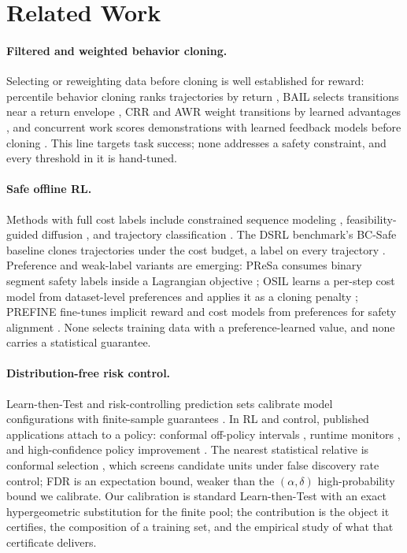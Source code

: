 \documentclass{article} %
\begin{document}
\section{Related Work}
\label{sec:related}

\paragraph{Filtered and weighted behavior cloning.}
Selecting or reweighting data before cloning is well established for reward: percentile behavior cloning ranks trajectories by return \citep{chen2021dt, emmons2022rvs}, BAIL selects transitions near a return envelope \citep{chen2020bail}, CRR and AWR weight transitions by learned advantages \citep{wang2020crr, peng2019awr}, and concurrent work scores demonstrations with learned feedback models before cloning \citep{liang2026robometer, beck2025sfbc}. This line targets task success; none addresses a safety constraint, and every threshold in it is hand-tuned.

\paragraph{Safe offline RL.}
Methods with full cost labels include constrained sequence modeling \citep{liu2023cdt}, feasibility-guided diffusion \citep{zheng2024fisor}, and trajectory classification \citep{gong2025trac}. The DSRL benchmark's BC-Safe baseline clones trajectories under the cost budget, a label on every trajectory \citep{liu2024dsrl}. Preference and weak-label variants are emerging: PReSa consumes binary segment safety labels inside a Lagrangian objective \citep{gong2026presa}; OSIL learns a per-step cost model from dataset-level preferences and applies it as a cloning penalty \citep{burnwal2026osil}; PREFINE fine-tunes implicit reward and cost models from preferences for safety alignment \citep{prefine2025}. None selects training data with a preference-learned value, and none carries a statistical guarantee.

\paragraph{Distribution-free risk control.}
Learn-then-Test and risk-controlling prediction sets calibrate model configurations with finite-sample guarantees \citep{angelopoulos2025ltt, bates2021rcps, angelopoulos2024crc}. In RL and control, published applications attach to a policy: conformal off-policy intervals \citep{taufiq2022copp}, runtime monitors \citep{feldman2025conformal}, and high-confidence policy improvement \citep{thomas2015hcpi, laroche2019spibb}. The nearest statistical relative is conformal selection \citep{jin2023conformal}, which screens candidate units under false discovery rate control; FDR is an expectation bound, weaker than the $(\alpha, \delta)$ high-probability bound we calibrate. Our calibration is standard Learn-then-Test with an exact hypergeometric substitution for the finite pool; the contribution is the object it certifies, the composition of a training set, and the empirical study of what that certificate delivers.
\end{document}
